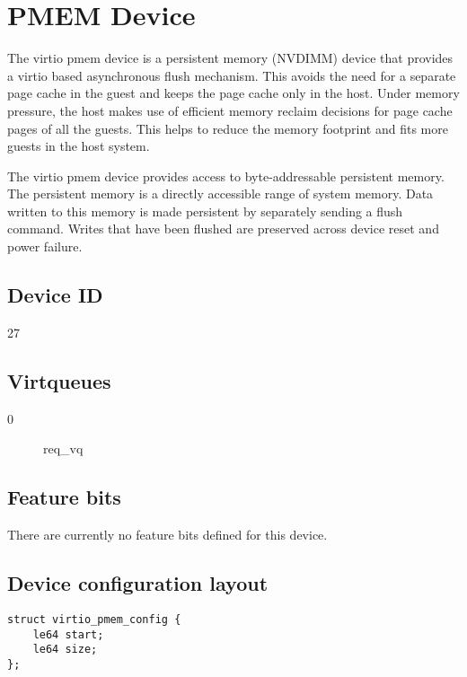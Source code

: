 \section{PMEM Device}\label{sec:Device Types / PMEM Device}

The virtio pmem device is a persistent memory (NVDIMM) device
that provides a virtio based asynchronous flush mechanism. This avoids
the need for a separate page cache in the guest and keeps the page cache
only in the host. Under memory pressure, the host makes use of
efficient memory reclaim decisions for page cache pages of all the
guests. This helps to reduce the memory footprint and fits more guests
in the host system.

The virtio pmem device provides access to byte-addressable persistent
memory. The persistent memory is a directly accessible range of system memory.
Data written to this memory is made persistent by separately sending a
flush command. Writes that have been flushed are preserved across device
reset and power failure.

\subsection{Device ID}\label{sec:Device Types / PMEM Device / Device ID}
  27

\subsection{Virtqueues}\label{sec:Device Types / PMEM Device / Virtqueues}
\begin{description}
\item[0] req_vq
\end{description}

\subsection{Feature bits}\label{sec:Device Types / PMEM Device / Feature bits}

There are currently no feature bits defined for this device.

\subsection{Device configuration layout}\label{sec:Device Types / PMEM Device / Device configuration layout}

\begin{lstlisting}
struct virtio_pmem_config {
	le64 start;
	le64 size;
};
\end{lstlisting}

